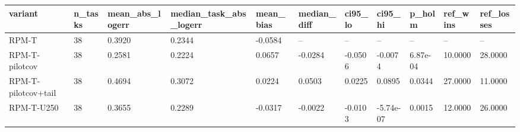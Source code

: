 \begin{tabular}{lllllllllll}
\hline
variant & n\_tasks & mean\_abs\_logerr & median\_task\_abs\_logerr & mean\_bias & median\_diff & ci95\_lo & ci95\_hi & p\_holm & ref\_wins & ref\_losses \\
\hline
RPM-T & 38 & 0.3920 & 0.2344 & -0.0584 & – & – & – & – & – & – \\
RPM-T-pilotcov & 38 & 0.2581 & 0.2224 & 0.0657 & -0.0284 & -0.0506 & -0.0074 & 6.87e-04 & 10.0000 & 28.0000 \\
RPM-T-pilotcov+tail & 38 & 0.4694 & 0.3072 & 0.0224 & 0.0503 & 0.0225 & 0.0895 & 0.0344 & 27.0000 & 11.0000 \\
RPM-T-U250 & 38 & 0.3655 & 0.2289 & -0.0317 & -0.0022 & -0.0103 & -5.74e-07 & 0.0015 & 12.0000 & 26.0000 \\
\hline
\end{tabular}
